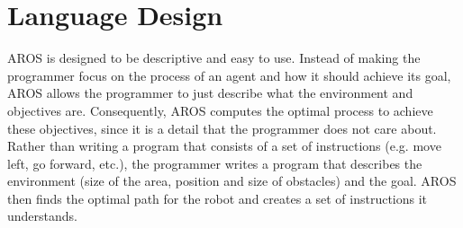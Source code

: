 \chapter{Language Design}
\label{chap:LanguageDesign} 

AROS is designed to be descriptive and easy to use. Instead of making the programmer focus on the process of an agent and how it should achieve its goal, AROS allows the programmer to just describe what the environment and objectives are. Consequently, AROS computes the optimal process to achieve these objectives, since it is a detail that the programmer does not care about. Rather than writing a program that consists of a set of instructions (e.g. move left, go forward, etc.), the programmer writes a program that describes the environment (size of the area, position and size of obstacles) and the goal. AROS then finds the optimal path for the robot and creates a set of instructions it understands. 




